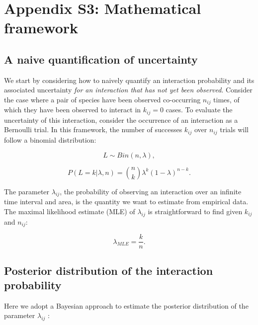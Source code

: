 \documentclass[12pt]{article}
\begin{document}
\clearpage

\section*{Appendix S3: Mathematical framework}

  \subsection*{A naive quantification of uncertainty}

    We start by considering how to naively quantify an interaction probability and its associated uncertainty \emph{for an interaction that has not yet been observed}. Consider the case where a pair of species have been observed co-occurring $n_{ij}$ times, of which they have been observed to interact in $k_{ij}= 0$ cases. To evaluate the uncertainty of this interaction, consider the occurrence of an interaction as a Bernoulli trial. In this framework, the number of successes $k_{ij}$ over $n_{ij}$ trials will follow a binomial distribution: 
        
        \begin{equation}
          L \sim Bin(n,\lambda) ,
        \end{equation}


        \begin{equation}
           P(L = k|\lambda,n) = {n \choose k}\lambda^k(1-\lambda)^{n-k} . 
           \label{likelihood}
        \end{equation}

    \noindent The parameter $\lambda_{ij}$, the probability of observing an interaction over an infinite time interval and area, is the quantity we want to estimate from empirical data. 
    The maximal likelihood estimate (MLE) of $\lambda_{ij}$ is straightforward to find given $k_{ij}$ and $n_{ij}$:

        \begin{equation}
          \lambda_{MLE} = \frac{k}{n}  .
          \label{theta_MLE}
        \end{equation}


  \subsection*{Posterior distribution of the interaction probability}

    Here we adopt a Bayesian approach to estimate the posterior distribution of the parameter $\lambda_{ij}$ :
\end{document}
